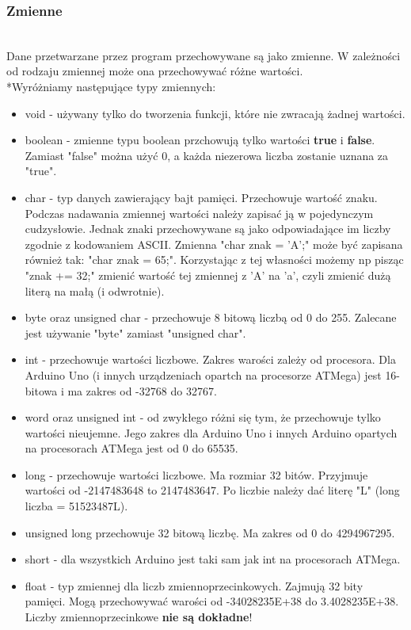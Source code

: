 	\subsubsection{Zmienne}
		\\Dane przetwarzane przez program przechowywane są jako zmienne. W zależności od rodzaju zmiennej może ona przechowywać różne wartości.
		\\*Wyróżniamy następujące typy zmiennych:
		\begin{itemize}
			\item void - używany tylko do tworzenia funkcji, które nie zwracają żadnej wartości.
			\item boolean - zmienne typu boolean przchowują tylko wartości \textbf{true} i \textbf{false}. Zamiast "false" można użyć 0, a każda niezerowa liczba zostanie uznana za "true".
			\item char - typ danych zawierający bajt pamięci. Przechowuje wartość znaku.
				Podczas nadawania zmiennej wartości należy zapisać ją w pojedynczym cudzysłowie.
				Jednak znaki przechowywane są jako odpowiadające im liczby zgodnie z kodowaniem ASCII.
				Zmienna "char znak = 'A';" może być zapisana również tak: "char znak = 65;".
				Korzystając z tej własności możemy np pisząc "znak += 32;" zmienić wartość tej zmiennej z 'A' na 'a', czyli zmienić dużą literą na małą (i odwrotnie).
			\item byte oraz unsigned char - przechowuje 8 bitową liczbą od 0 do 255. Zalecane jest używanie "byte" zamiast "unsigned char".
			\item int - przechowuje wartości liczbowe. Zakres warości zależy od procesora.
				Dla Arduino Uno (i innych urządzeniach opartch na procesorze ATMega) jest 16-bitowa i ma zakres od -32768 do 32767.
			\item word oraz unsigned int - od zwykłego różni się tym, że przechowuje tylko wartości nieujemne.
				Jego zakres dla Arduino Uno i innych Arduino opartych na procesorach ATMega jest od 0 do 65535.
			\item long - przechowuje wartości liczbowe. Ma rozmiar 32 bitów. Przyjmuje wartości od -2147483648 to 2147483647. Po liczbie należy dać literę "L" (long liczba = 51523487L).
			\item unsigned long przechowuje 32 bitową liczbę. Ma zakres od 0 do 4294967295.
			\item short - dla wszystkich Arduino jest taki sam jak int na procesorach ATMega.
			\item float - typ zmiennej dla liczb zmiennoprzecinkowych. Zajmują 32 bity pamięci. Mogą przechowywać warości od -34028235E+38 do 3.4028235E+38. Liczby zmiennoprzecinkowe \textbf{nie są dokładne}!

\end{itemize}
